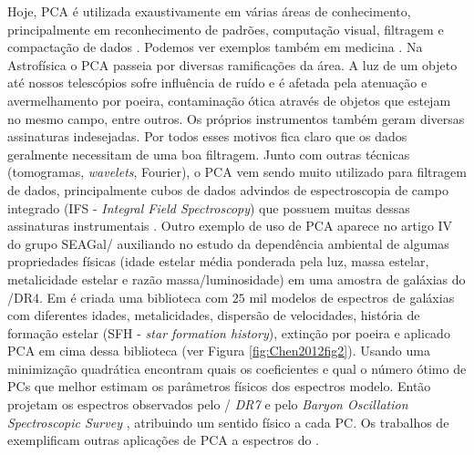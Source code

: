 Hoje, PCA é utilizada exaustivamente em várias áreas de conhecimento, principalmente em reconhecimento de padrões,
computação visual, filtragem e compactação de dados \citep{Kamruzzaman2010, Borcea2012}. Podemos ver exemplos também em
medicina \citep{Balakrishnan2013}. Na Astrofísica o PCA passeia por diversas ramificações da área. A luz de um objeto
até nossos telescópios sofre influência de ruído e é afetada pela atenuação e avermelhamento por poeira, contaminação
ótica através de objetos que estejam no mesmo campo, entre outros. Os próprios instrumentos também geram diversas
assinaturas indesejadas. Por todos esses motivos fica claro que os dados geralmente necessitam de uma boa filtragem.
Junto com outras técnicas (tomogramas, {\em wavelets}, Fourier), o PCA vem sendo muito utilizado para filtragem de
dados, principalmente cubos de dados advindos de espectroscopia de campo integrado (IFS - {\em Integral Field
Spectroscopy}) que possuem muitas dessas assinaturas instrumentais \citep{Riffel2011}. Outro exemplo de uso de PCA
aparece no artigo IV do grupo SEAGal/\starlight \citep{Mateus2007} auxiliando no estudo da dependência ambiental de
algumas propriedades físicas (idade estelar média ponderada pela luz, massa estelar, metalicidade estelar e razão
massa/luminosidade) em uma amostra de galáxias do \SDSS/DR4. Em \citet{Chen2012} é criada uma biblioteca com $25$ mil
modelos de espectros de galáxias com diferentes idades, metalicidades, dispersão de velocidades, história de formação
estelar (SFH - {\em star formation history}), extinção por poeira e aplicado PCA em cima dessa biblioteca (ver Figura
\ref{fig:Chen2012fig2}). Usando uma minimização quadrática encontram quais os coeficientes e qual o número ótimo de PCs
que melhor estimam os parâmetros físicos dos espectros modelo. Então projetam os espectros observados pelo \SDSS/{\em
DR7} \citep{Abazajian2009} e pelo {\em Baryon Oscillation Spectroscopic Survey} \citep[BOSS;][]{Ahn2012}, atribuindo um
sentido físico a cada PC. Os trabalhos de \citet{Ferreras2006, Wild2006, Rogers2007} exemplificam outras aplicações de
PCA a espectros do \SDSS.

